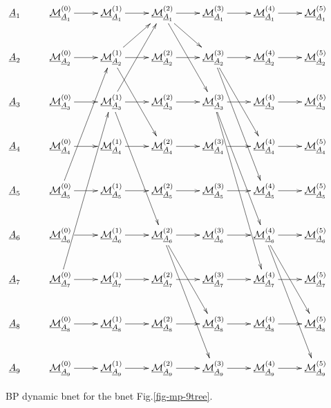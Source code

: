 \begin{figure}[h!]
$$\xymatrix{
\rvA_1 
&\ucalm^{(0)}_{\rvA_1}\ar[r]
&\ucalm^{(1)}_{\rvA_1}\ar[r]
&\ucalm^{(2)}_{\rvA_1}\ar[r]\ar[dr]\ar[ddr]
&\ucalm^{(3)}_{\rvA_1}\ar[r]
&\ucalm^{(4)}_{\rvA_1}\ar[r]
&\ucalm^{(5)}_{\rvA_1}
\\
\rvA_2 
&\ucalm^{(0)}_{\rvA_2}\ar[r]
&\ucalm^{(1)}_{\rvA_2}\ar[r]\ar[ur]\ar[ddr]
&\ucalm^{(2)}_{\rvA_2}\ar[r]
&\ucalm^{(3)}_{\rvA_2}\ar[r]\ar[ddr]\ar[dddr]
&\ucalm^{(4)}_{\rvA_2}\ar[r]
&\ucalm^{(5)}_{\rvA_2}
\\
\rvA_3 
&\ucalm^{(0)}_{\rvA_3}\ar[r]
&\ucalm^{(1)}_{\rvA_3}\ar[r]\ar[uur]\ar[dddr]
&\ucalm^{(2)}_{\rvA_3}\ar[r]
&\ucalm^{(3)}_{\rvA_3}\ar[r]\ar[dddr]\ar[ddddr]
&\ucalm^{(4)}_{\rvA_3}\ar[r]
&\ucalm^{(5)}_{\rvA_3}
\\
\rvA_4 
&\ucalm^{(0)}_{\rvA_4}\ar[r]
&\ucalm^{(1)}_{\rvA_4}\ar[r]
&\ucalm^{(2)}_{\rvA_4}\ar[r]
&\ucalm^{(3)}_{\rvA_4}\ar[r]
&\ucalm^{(4)}_{\rvA_4}\ar[r]
&\ucalm^{(5)}_{\rvA_4}
\\
\rvA_5 
&\ucalm^{(0)}_{\rvA_5}\ar[r]\ar[uuur]
&\ucalm^{(1)}_{\rvA_5}\ar[r]
&\ucalm^{(2)}_{\rvA_5}\ar[r]
&\ucalm^{(3)}_{\rvA_5}\ar[r]
&\ucalm^{(4)}_{\rvA_5}\ar[r]
&\ucalm^{(5)}_{\rvA_5}
\\
\rvA_6 
&\ucalm^{(0)}_{\rvA_6}\ar[r]
&\ucalm^{(1)}_{\rvA_6}\ar[r]
&\ucalm^{(2)}_{\rvA_6}\ar[r]\ar[ddr]\ar[dddr]
&\ucalm^{(3)}_{\rvA_6}\ar[r]
&\ucalm^{(4)}_{\rvA_6}\ar[r]\ar[ddr]\ar[dddr]
&\ucalm^{(5)}_{\rvA_6}
\\
\rvA_7 
&\ucalm^{(0)}_{\rvA_7}\ar[r]\ar[uuuur]
&\ucalm^{(1)}_{\rvA_7}\ar[r]
&\ucalm^{(2)}_{\rvA_7}\ar[r]
&\ucalm^{(3)}_{\rvA_7}\ar[r]
&\ucalm^{(4)}_{\rvA_7}\ar[r]
&\ucalm^{(5)}_{\rvA_7}
\\
\rvA_8 
&\ucalm^{(0)}_{\rvA_8}\ar[r]
&\ucalm^{(1)}_{\rvA_8}\ar[r]
&\ucalm^{(2)}_{\rvA_8}\ar[r]
&\ucalm^{(3)}_{\rvA_8}\ar[r]
&\ucalm^{(4)}_{\rvA_8}\ar[r]
&\ucalm^{(5)}_{\rvA_8}
\\
\rvA_9 
&\ucalm^{(0)}_{\rvA_9}\ar[r]
&\ucalm^{(1)}_{\rvA_9}\ar[r]
&\ucalm^{(2)}_{\rvA_9}\ar[r]
&\ucalm^{(3)}_{\rvA_9}\ar[r]
&\ucalm^{(4)}_{\rvA_9}\ar[r]
&\ucalm^{(5)}_{\rvA_9}
\\
}$$
\caption{BP dynamic bnet for the bnet
Fig.\ref{fig-mp-9tree}.}
\label{fig-propagation-9tree}
\end{figure}

